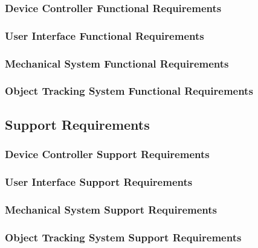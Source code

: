 \subsubsection{Device Controller Functional Requirements}

\subsubsection{User Interface Functional Requirements}

\subsubsection{Mechanical System Functional Requirements}

\subsubsection{Object Tracking System Functional Requirements}

\subsection{Support Requirements}

\subsubsection{Device Controller Support Requirements}

\subsubsection{User Interface Support Requirements}

\subsubsection{Mechanical System Support Requirements}

\subsubsection{Object Tracking System Support Requirements}



